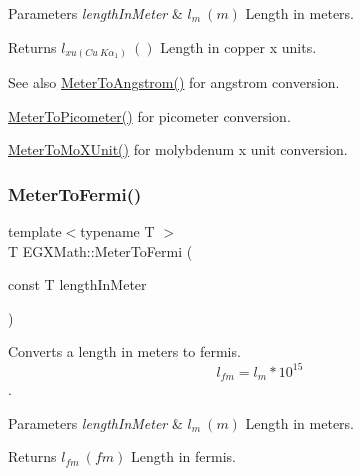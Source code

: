 \begin{DoxyParams}{Parameters}
{\em length\+In\+Meter} & $ l_{m}\ (m)$ Length in meters. \\
\hline
\end{DoxyParams}
\begin{DoxyReturn}{Returns}
$ l_{xu(Cu\ K\alpha_1)}\ ()$ Length in copper x units. 
\end{DoxyReturn}
\begin{DoxySeeAlso}{See also}
\mbox{\hyperlink{group___e_g_x_math-_conversions-_length_conversions-_meter-_non-_s_i_ga9e6d5040f58d167bd7a4b6cebb5527ee}{Meter\+To\+Angstrom()}} for angstrom conversion. 

\mbox{\hyperlink{group___e_g_x_math-_conversions-_length_conversions-_meter-_s_i_ga5e136454c20254062d6e8637cfbfb8ee}{Meter\+To\+Picometer()}} for picometer conversion. 

\mbox{\hyperlink{group___e_g_x_math-_conversions-_length_conversions-_meter-_non-_s_i_gae0351200a3d90c4efe741c6057b2fd4b}{Meter\+To\+Mo\+X\+Unit()}} for molybdenum x unit conversion. 
\end{DoxySeeAlso}
\mbox{\label{group___e_g_x_math-_conversions-_length_conversions-_meter-_non-_s_i_ga2cf89a4a80da02e3e3c82e844095acfe}} 
\subsubsection{\texorpdfstring{Meter\+To\+Fermi()}{MeterToFermi()}}
{\footnotesize\ttfamily template$<$typename T $>$ \\
T E\+G\+X\+Math\+::\+Meter\+To\+Fermi (\begin{DoxyParamCaption}\item[{const T}]{length\+In\+Meter }\end{DoxyParamCaption})}



Converts a length in meters to fermis. \[ l_{fm}=l_{m} * 10^{15} \]. 


\begin{DoxyParams}{Parameters}
{\em length\+In\+Meter} & $ l_{m}\ (m)$ Length in meters. \\
\hline
\end{DoxyParams}
\begin{DoxyReturn}{Returns}
$ l_{fm}\ (fm)$ Length in fermis. 
\end{DoxyReturn}
\mbox{\label{group___e_g_x_math-_conversions-_length_conversions-_meter-_non-_s_i_ga9655833d43ede59b17c54a6f06f9681a}} 
